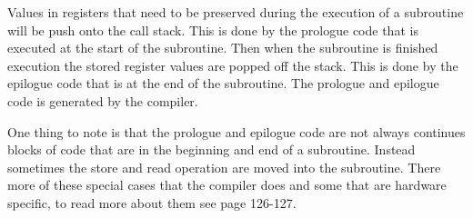  


Values in registers that need to be preserved during the execution of a subroutine will be push onto the call stack.
This is done by the prologue code that is executed at the start of the subroutine.
Then when the subroutine is finished execution the stored register values are popped off the stack.
This is done by the epilogue code that is at the end of the subroutine.
The prologue and epilogue code is generated by the compiler.


One thing to note is that the prologue and epilogue code are not always continues blocks of code that are in the beginning and end of a subroutine.
Instead sometimes the store and read operation are moved into the subroutine.
There more of these special cases that the compiler does and some that are hardware specific, to read more about them see \cite{dwarf} page 126-127.

